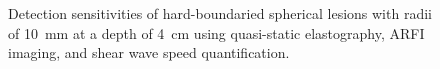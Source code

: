 \documentclass{article}
\begin{document}

			\begin{figure}[!htb]
				\centering
				\caption[Detection sensitivities of hard-boundaried spherical lesions using the three investigated imaging modalities]{Detection sensitivities of hard-boundaried spherical lesions with radii of \SI{10}{\mm} at a depth of \SI{4}{\cm} using quasi-static elastography, ARFI imaging, and shear wave speed quantification.}
				\label{fig:conclusion_radius}
			\end{figure}
\end{document}
